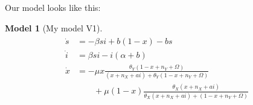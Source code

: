 \documentclass[10pt,a4paper]{article}
\newtheorem{model}{Model}[section]
\begin{document}
Our model looks like this:
	\begin{model}[My model V1]
		\begin{align}
		\begin{split}
		\dot{s} &= -\beta si + b\left(1-x\right) - bs\\
		\dot{i} &= \beta si - i\left(\alpha + b\right)\\
		\dot{x} &= -\mu x\frac{\theta_Y(1-x+n_Y+\Omega)}{(x+n_X+ai) + \theta_Y(1-x+n_Y+\Omega)}\\
			&\qquad+ \mu \left(1-x\right)\frac{\theta_X (x+ n_X+ ai)}{\theta_X (x + n_X + ai) + (1-x + n_Y + \Omega)}
		\end{split}
		\end{align}
	\end{model}

\end{document}
